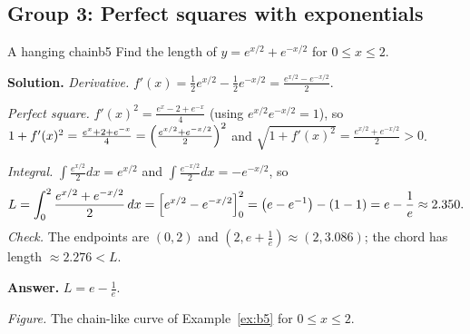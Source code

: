 \documentclass[11pt]{article}
\begin{document}
\subsection*{Group 3: Perfect squares with exponentials}

\begin{exmp}{A hanging chain}{b5}
Find the length of $y=e^{x/2}+e^{-x/2}$ for $0\le x\le2$.

\textbf{Solution.} \emph{Derivative.} $f'(x)=\frac12e^{x/2}-\frac12e^{-x/2}=\frac{e^{x/2}-e^{-x/2}}2$.

\emph{Perfect square.} $f'(x)^2=\frac{e^x-2+e^{-x}}4$ (using $e^{x/2}e^{-x/2}=1$), so $1+f'(x)^2=\frac{e^x+2+e^{-x}}4=\Bigl(\frac{e^{x/2}+e^{-x/2}}2\Bigr)^2$ and $\sqrt{1+f'(x)^2}=\frac{e^{x/2}+e^{-x/2}}2>0$.

\emph{Integral.} $\int\frac{e^{x/2}}2dx=e^{x/2}$ and $\int\frac{e^{-x/2}}2dx=-e^{-x/2}$, so
\[
L=\int_0^2\frac{e^{x/2}+e^{-x/2}}2\,dx=\Bigl[e^{x/2}-e^{-x/2}\Bigr]_0^2=\bigl(e-e^{-1}\bigr)-(1-1)=e-\frac1e\approx2.350 .
\]
\emph{Check.} The endpoints are $(0,2)$ and $(2,e+\frac1e)\approx(2,3.086)$; the chord has length $\approx2.276<L$.

\textbf{Answer.} $L=e-\frac1e$.
\begin{center}
\par\small\emph{Figure.} The chain-like curve of Example~\ref{ex:b5} for $0\le x\le2$.
\end{center}
\end{exmp}
\end{document}
